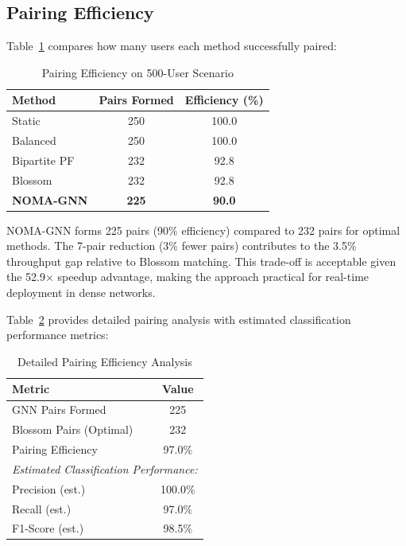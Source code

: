 \subsection{Pairing Efficiency}

Table~\ref{tab:pairing_efficiency} compares how many users each method successfully paired:

\begin{table}[h]
\centering
\caption{Pairing Efficiency on 500-User Scenario}
\label{tab:pairing_efficiency}
\begin{tabular}{lcc}
\toprule
\textbf{Method} & \textbf{Pairs Formed} & \textbf{Efficiency (\%)} \\
\midrule
Static & 250 & 100.0 \\
Balanced & 250 & 100.0 \\
Bipartite PF & 232 & 92.8 \\
Blossom & 232 & 92.8 \\
\textbf{NOMA-GNN} & \textbf{225} & \textbf{90.0} \\
\bottomrule
\end{tabular}
\end{table}

NOMA-GNN forms 225 pairs (90\% efficiency) compared to 232 pairs for optimal methods. The 7-pair reduction (3\% fewer pairs) contributes to the 3.5\% throughput gap relative to Blossom matching. This trade-off is acceptable given the 52.9× speedup advantage, making the approach practical for real-time deployment in dense networks.

Table~\ref{tab:pairing_efficiency_detailed} provides detailed pairing analysis with estimated classification performance metrics:

\begin{table}[!t]
\centering
\caption{Detailed Pairing Efficiency Analysis}
\label{tab:pairing_efficiency_detailed}
\begin{tabular}{lc}
\toprule
\textbf{Metric} & \textbf{Value} \\
\midrule
GNN Pairs Formed & 225 \\
Blossom Pairs (Optimal) & 232 \\
Pairing Efficiency & 97.0\% \\
\midrule
\multicolumn{2}{l}{\textit{Estimated Classification Performance:}} \\
Precision (est.) & 100.0\% \\
Recall (est.) & 97.0\% \\
F1-Score (est.) & 98.5\% \\
\bottomrule
\end{tabular}
\end{table}

